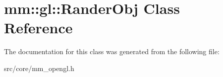 \hypertarget{classmm_1_1gl_1_1_rander_obj}{}\section{mm\+:\+:gl\+:\+:Rander\+Obj Class Reference}
\label{classmm_1_1gl_1_1_rander_obj}


The documentation for this class was generated from the following file\+:\begin{DoxyCompactItemize}
\item 
src/core/mm\+\_\+opengl.\+h\end{DoxyCompactItemize}
